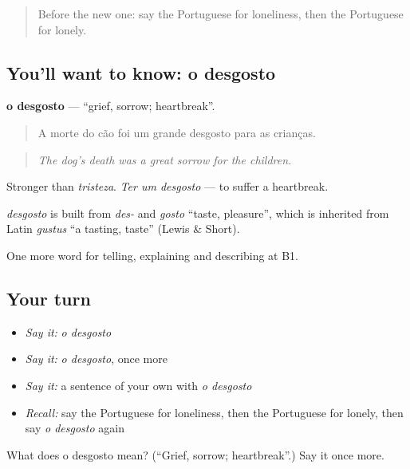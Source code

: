 \label{lesson:PT-C478-desgosto}



\begin{quote}
Before the new one: say the Portuguese for loneliness, then the Portuguese for lonely.
\end{quote}

\subsection*{You'll want to know: o desgosto}
\textbf{o desgosto} — \textquotedblleft{}grief, sorrow; heartbreak\textquotedblright{}.

\begin{quote}
A morte do cão foi um grande desgosto para as crianças.
\end{quote}

\begin{quote}
\emph{The dog's death was a great sorrow for the children.}
\end{quote}

Stronger than \emph{tristeza}. \emph{Ter um desgosto} — to suffer a heartbreak.

\begin{cousinweb}
\emph{desgosto} is built from \emph{des-} and \emph{gosto} \textquotedblleft{}taste, pleasure\textquotedblright{}, which is inherited from Latin \emph{gustus} \textquotedblleft{}a tasting, taste\textquotedblright{} (Lewis \& Short).
\end{cousinweb}

\begin{grammarlens}[title={What you've built}]
One more word for telling, explaining and describing at B1.
\end{grammarlens}

\subsection*{Your turn}
\begin{itemize}
\raggedright
  \item \emph{Say it:} \emph{o desgosto}
  \item \emph{Say it:} \emph{o desgosto}, once more
  \item \emph{Say it:} a sentence of your own with \emph{o desgosto}
  \item \emph{Recall:} say the Portuguese for loneliness, then the Portuguese for lonely, then say \emph{o desgosto} again
\end{itemize}

\begin{tcolorbox}[breakable,colback=teal!4,colframe=teal!35!black,title={Before you move on}]
What does o desgosto mean? (\textquotedblleft{}Grief, sorrow; heartbreak\textquotedblright{}.) Say it once more.
\end{tcolorbox}
